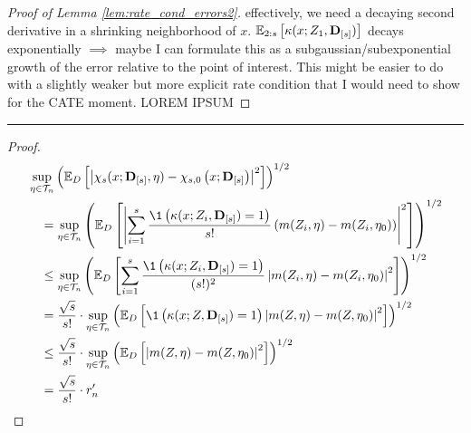 \begin{proof}[Proof of Lemma \ref{lem:rate_cond_errors2}]
    {\color{blue} effectively, we need a decaying second derivative in a shrinking neighborhood of $x$.
    $\mathbb{E}_{2:s}\left[\kappa(x; Z_{1}, \mathbf{D}_{[s]})\right]$ decays exponentially $\implies$ maybe I can formulate this as a subgaussian/subexponential growth of the error relative to the point of interest.
    This might be easier to do with a slightly weaker but more explicit rate condition that I would need to show for the CATE moment.}
    {\color{red} LOREM IPSUM}
\end{proof}

\hrule

\begin{lem}
    
\end{lem}

\begin{proof}
    \begin{equation}
        \begin{aligned}
            & \sup_{\eta \in \mathcal{T}_{n}}\left(
                \E_{D}\left[
                    \left|\chi_{s}(x; \mathbf{D}_{[s]}, \eta) - \chi_{s,0}\left(x; \mathbf{D}_{[s]}\right)
                    \right|^2
                \right]
            \right)^{1 / 2} \\
            & \quad = \sup_{\eta \in \mathcal{T}_{n}}\left(
                \E_{D}\left[
                    \left|\sum_{i = 1}^{s}\frac{\1\left(\kappa(x; Z_{i}, \mathbf{D}_{[s]}) = 1\right)}{s!} 
                    \left(m(Z_{i}, \eta) - m(Z_{i}, \eta_{0})\right)
                    \right|^2
                \right]
            \right)^{1 / 2} \\
            & \quad \leq \sup_{\eta \in \mathcal{T}_{n}}\left(
                \E_{D}\left[\sum_{i = 1}^{s}\frac{\1\left(\kappa(x; Z_{i}, \mathbf{D}_{[s]}) = 1\right)}{(s!)^{2}}
                    \left| m(Z_{i}, \eta) - m(Z_{i}, \eta_{0})\right|^2
                \right]
            \right)^{1 / 2} \\
            & \quad = \frac{\sqrt{s}}{s!} \cdot \sup_{\eta \in \mathcal{T}_{n}}\left(
                 \E_{D}\left[\1\left(\kappa(x; Z, \mathbf{D}_{[s]}) = 1\right)
                    \left| m(Z, \eta) - m(Z, \eta_{0})\right|^2
                \right]
            \right)^{1 / 2} \\
            & \quad \leq \frac{\sqrt{s}}{s!} \cdot \sup_{\eta \in \mathcal{T}_{n}}\left(
                \E_{D}\left[\left| m(Z, \eta) - m(Z, \eta_{0})\right|^2\right]
            \right)^{1 / 2} \\
            & \quad = \frac{\sqrt{s}}{s!} \cdot r_{n}^{\prime}
        \end{aligned}
    \end{equation}
\end{proof}

